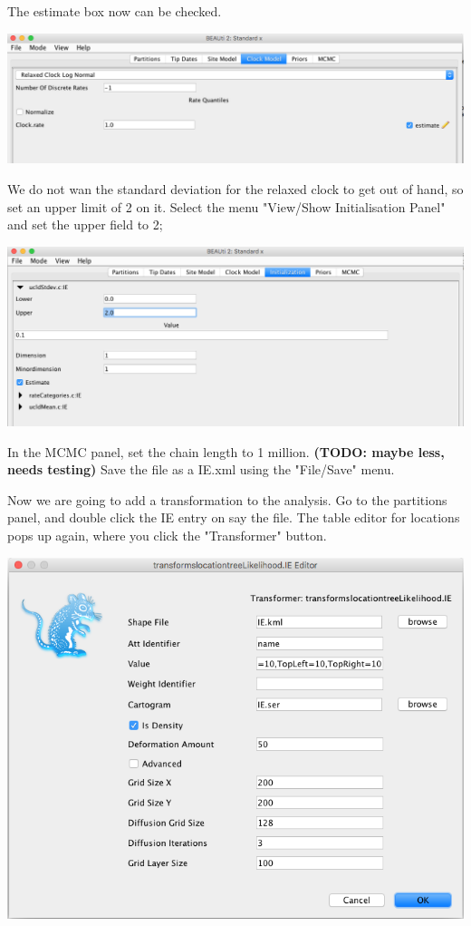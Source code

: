 \documentclass{article}
\begin{document}
The estimate box now can be checked.

\begin{center}
\includegraphics[scale=0.4]{figures/BEAUti_transform6}
\end{center}

We do not wan the standard deviation for the relaxed clock to get out of hand, so set an upper limit of 2 on it. Select the menu "View/Show Initialisation Panel" and set the upper field to 2;

\begin{center}
\includegraphics[scale=0.4]{figures/BEAUti_transform7}
\end{center}

In the MCMC panel, set the chain length to 1 million. {\bf\color{red}(TODO: maybe less, needs testing)}
Save the file as a IE.xml using the "File/Save" menu.

Now we are going to add a transformation to the analysis. Go to the partitions panel, and double click the IE entry on say the file. The table editor for locations pops up again, where you click the "Transformer" button.

\begin{center}
\includegraphics[scale=0.4]{figures/BEAUti_transform8}
\end{center}
\end{document}
